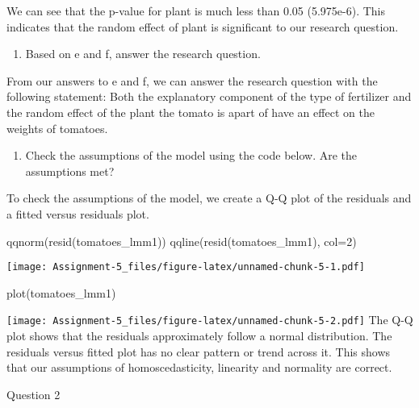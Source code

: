 \documentclass[
]{article}
\newenvironment{Shaded}{\begin{snugshade}}{\end{snugshade}}
\newcommand{\AttributeTok}[1]{\textcolor[rgb]{0.77,0.63,0.00}{#1}}
\newcommand{\DecValTok}[1]{\textcolor[rgb]{0.00,0.00,0.81}{#1}}
\newcommand{\FunctionTok}[1]{\textcolor[rgb]{0.00,0.00,0.00}{#1}}
\newcommand{\NormalTok}[1]{#1}
\providecommand{\tightlist}{%
  \setlength{\itemsep}{0pt}\setlength{\parskip}{0pt}}
\begin{document}
We can see that the p-value for plant is much less than 0.05 (5.975e-6).
This indicates that the random effect of plant is significant to our
research question.

\begin{enumerate}
\def\labelenumi{\alph{enumi}.}
\setcounter{enumi}{6}
\tightlist
\item
  Based on e and f, answer the research question.
\end{enumerate}

From our answers to e and f, we can answer the research question with
the following statement: Both the explanatory component of the type of
fertilizer and the random effect of the plant the tomato is apart of
have an effect on the weights of tomatoes.

\begin{enumerate}
\def\labelenumi{\alph{enumi}.}
\setcounter{enumi}{7}
\tightlist
\item
  Check the assumptions of the model using the code below. Are the
  assumptions met?
\end{enumerate}

To check the assumptions of the model, we create a Q-Q plot of the
residuals and a fitted versus residuals plot.

\begin{Shaded}
\begin{Highlighting}[]
\FunctionTok{qqnorm}\NormalTok{(}\FunctionTok{resid}\NormalTok{(tomatoes\_lmm1))}
\FunctionTok{qqline}\NormalTok{(}\FunctionTok{resid}\NormalTok{(tomatoes\_lmm1), }\AttributeTok{col=}\DecValTok{2}\NormalTok{)}
\end{Highlighting}
\end{Shaded}

\texttt{[image: Assignment-5\_files/figure-latex/unnamed-chunk-5-1.pdf]}

\begin{Shaded}
\begin{Highlighting}[]
\FunctionTok{plot}\NormalTok{(tomatoes\_lmm1)}
\end{Highlighting}
\end{Shaded}

\texttt{[image: Assignment-5\_files/figure-latex/unnamed-chunk-5-2.pdf]}
The Q-Q plot shows that the residuals approximately follow a normal
distribution. The residuals versus fitted plot has no clear pattern or
trend across it. This shows that our assumptions of homoscedasticity,
linearity and normality are correct.

Question 2
\end{document}

